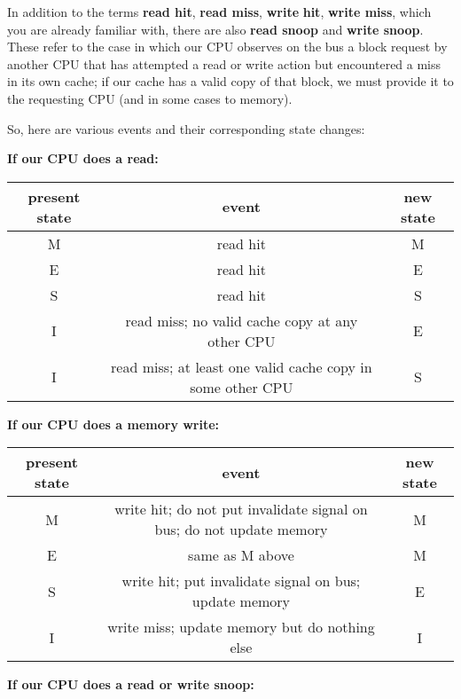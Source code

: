 In addition to the terms \textbf{read hit}, \textbf{read miss},
\textbf{write} \textbf{hit}, \textbf{write miss}, which you are already
familiar with, there are also \textbf{read snoop} and \textbf{write
snoop}.  These refer to the case in which our CPU observes on the bus a
block request by another CPU that has attempted a read or write action
but encountered a miss in its own cache; if our cache has a valid copy
of that block, we must provide it to the requesting CPU (and in some
cases to memory).

So, here are various events and their corresponding state changes:

{\bf If our CPU does a read:}

\begin{tabular}{|c|c|c|}
\hline
present state&
 event&
 new state\\
\hline
M&
 read hit&
 M\\
\hline
E&
 read hit&
 E\\
\hline
S&
 read hit&
 S\\
\hline
I&
 read miss; no valid cache copy at any other CPU &
 E\\
\hline
I&
 read miss; at least one valid cache copy in some other CPU &
 S  \\
\hline
\end{tabular}

\par{} \vspace{0.3cm}

{\bf If our CPU does a memory write:}

\begin{tabular}{|c|c|c|}
\hline
present state&
 event&
 new state\\
\hline
M&
 write hit; do not put invalidate signal on bus; do not update memory&
 M\\
\hline
E&
 same as M above&
 M\\
\hline
S&
 write hit; put invalidate signal on bus; update memory&
 E\\
\hline
I&
 write miss; update memory but do nothing else&
 I  \\
\hline
\end{tabular}

\par{} \vspace{0.3cm}

{\bf If our CPU does a read or write snoop:}


